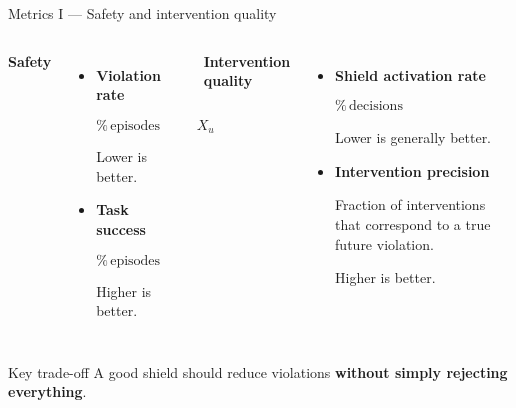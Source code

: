 \documentclass[aspectratio=169]{beamer}
\begin{document}
\begin{frame}[t,shrink=8]{Metrics I --- Safety and intervention quality}

\begin{columns}[T]


\textbf{Safety}

\begin{itemize}
    \item \textbf{Violation rate}
    
    \[
    \%\,\text{episodes entering }X_u
    \]
    
    Lower is better.
    
    \item \textbf{Task success}
    
    \[
    \%\,\text{episodes completing the task}
    \]
    
    Higher is better.
\end{itemize}


\textbf{Intervention quality}

\begin{itemize}
    \item \textbf{Shield activation rate}
    
    \[
    \%\,\text{decisions rejected/repaired/fallback}
    \]
    
    Lower is generally better.

    \item \textbf{Intervention precision}
    
    Fraction of interventions that correspond to a
    true future violation.
    
    Higher is better.
\end{itemize}

\end{columns}

\vspace{7pt}

\begin{alertblock}{Key trade-off}
A good shield should reduce violations \textbf{without simply rejecting
everything}.
\end{alertblock}

\end{frame}
\end{document}

